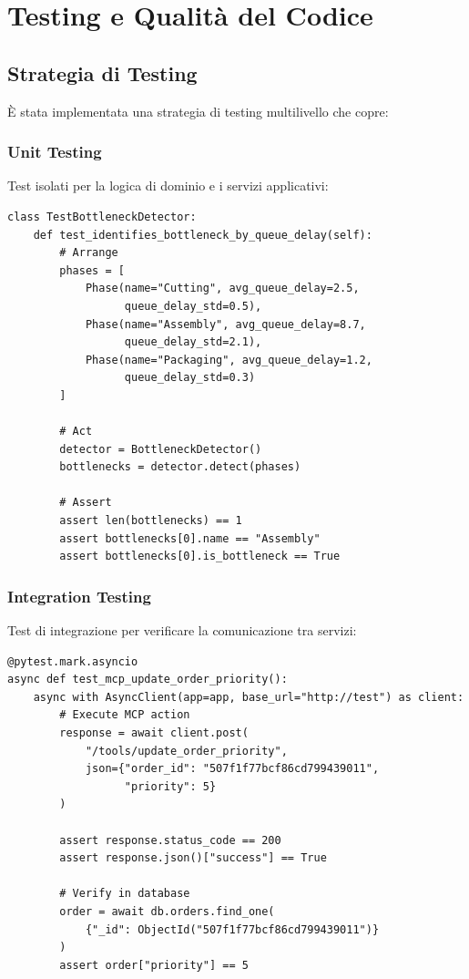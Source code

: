 \section{Testing e Qualità del Codice}
\label{sec:testing_quality}

\subsection{Strategia di Testing}
È stata implementata una strategia di testing multilivello che copre:

\subsubsection{Unit Testing}
Test isolati per la logica di dominio e i servizi applicativi:

\begin{listing}[H]
\begin{verbatim}
class TestBottleneckDetector:
    def test_identifies_bottleneck_by_queue_delay(self):
        # Arrange
        phases = [
            Phase(name="Cutting", avg_queue_delay=2.5, 
                  queue_delay_std=0.5),
            Phase(name="Assembly", avg_queue_delay=8.7, 
                  queue_delay_std=2.1),
            Phase(name="Packaging", avg_queue_delay=1.2, 
                  queue_delay_std=0.3)
        ]
        
        # Act
        detector = BottleneckDetector()
        bottlenecks = detector.detect(phases)
        
        # Assert
        assert len(bottlenecks) == 1
        assert bottlenecks[0].name == "Assembly"
        assert bottlenecks[0].is_bottleneck == True
\end{verbatim}
\caption{Test unitario per il BottleneckDetector}
\label{listing:test-bottleneck}
\end{listing}

\subsubsection{Integration Testing}
Test di integrazione per verificare la comunicazione tra servizi:

\begin{listing}[H]
\begin{verbatim}
@pytest.mark.asyncio
async def test_mcp_update_order_priority():
    async with AsyncClient(app=app, base_url="http://test") as client:
        # Execute MCP action
        response = await client.post(
            "/tools/update_order_priority",
            json={"order_id": "507f1f77bcf86cd799439011", 
                  "priority": 5}
        )
        
        assert response.status_code == 200
        assert response.json()["success"] == True
        
        # Verify in database
        order = await db.orders.find_one(
            {"_id": ObjectId("507f1f77bcf86cd799439011")}
        )
        assert order["priority"] == 5
\end{verbatim}
\caption{Test di integrazione MCP}
\label{listing:test-integration-mcp}
\end{listing}


